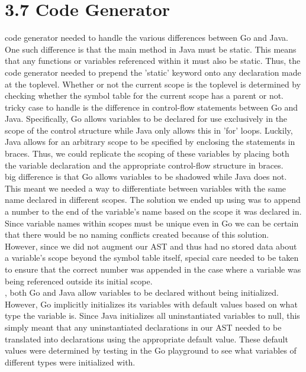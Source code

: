 \documentclass{article}
\begin{document}
\section*{3.7 Code Generator}\mbox{}
 code generator needed to handle the various differences between Go and Java.
One such difference is that the main method in Java must be static.
This means that any functions or variables referenced within it must also be static.
Thus, the code generator needed to prepend the 'static' keyword onto any declaration made at the toplevel.
Whether or not the current scope is the toplevel is determined by checking whether the symbol table for the current scope has a parent or not.\\
 tricky case to handle is the difference in control-flow statements between Go and Java.
Specifically, Go allows variables to be declared for use exclusively in the scope of the control structure while Java only allows this in 'for' loops.
Luckily, Java allows for an arbitrary scope to be specified by enclosing the statements in braces.
Thus, we could replicate the scoping of these variables by placing both the variable declaration and the appropriate control-flow structure in braces.
\\
 big difference is that Go allows variables to be shadowed while Java does not.
This meant we needed a way to differentiate between variables with the same name declared in different scopes.
The solution we ended up using was to append a number to the end of the variable's name based on the scope it was declared in.
Since variable names within scopes must be unique even in Go we can be certain that there would be no naming conflicts created because of this solution.
However, since we did not augment our AST and thus had no stored data about a variable's scope beyond the symbol table itself, special care needed to be taken to ensure that the correct number was appended in the case where a variable was being referenced outside its initial scope.
\\
, both Go and Java allow variables to be declared without being initialized.
However, Go implicitly initializes its variables with default values based on what type the variable is.
Since Java initializes all uninstantiated variables to null, this simply meant that any uninstantiated declarations in our AST needed to be translated into declarations using the appropriate default value.
These default values were determined by testing in the Go playground to see what variables of different types were initialized with.\\
\end{document}

